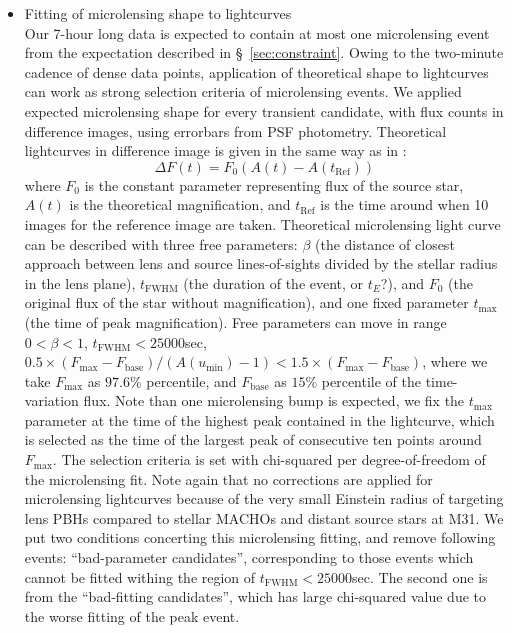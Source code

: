 \documentclass[iop, apj]{emulateapj}
\newcommand{\?}{\stackrel{?}{=}}
\begin{document}
%
\begin{itemize}
%
\item{Fitting of microlensing shape to lightcurves}\\
Our 7-hour long data is expected to contain at most 
one microlensing event from the expectation described in \S~\ref{sec:constraint}. 
Owing to the two-minute cadence of dense data points, 
application of theoretical shape to lightcurves can work as 
strong selection criteria of microlensing events. 
We applied expected microlensing shape for every transient candidate, 
with flux counts in difference images, using errorbars from PSF photometry. 
Theoretical lightcurves in difference image is given in the same way as in \citet{deJongetal:06}:
%
\begin{equation}
\Delta F (t)= F_0 (A(t) - A(t_\mathrm{Ref}))
\label{eq:chi2dof}
\end{equation}
%
where $F_0$ is the constant parameter representing flux of the source star, 
$A(t)$ is the theoretical magnification, and  
$t_\mathrm{Ref}$ is the time around when 10 images for the reference image are taken. 
Theoretical microlensing light curve can be described %
with three free parameters: $\beta$ (the distance of closest approach between lens and source lines-of-sights divided by the stellar radius in the lens plane), $t_\mathrm{FWHM}$ (the duration of the event, or $t_E$?), and $F_0$ (the original flux of the star without magnification),
and one fixed parameter $t_\mathrm{max}$ (the time of peak magnification). 
Free parameters can move in range $0<\beta<1$, $t_\mathrm{FWHM}<25000$sec, 
$0.5 \times (F_\mathrm{max}-F_\mathrm{base})/(A(u_\mathrm{min})-1)<1.5\times (F_\mathrm{max}-F_\mathrm{base})$, 
where we take $F_\mathrm{max}$ as $97.6\%$ percentile, and $F_\mathrm{base}$ as $15\%$ percentile of the time-variation flux. 
Note than one microlensing bump is expected, 
we fix the $t_\mathrm{max}$ parameter at the time of the highest peak contained in the lightcurve, 
which is selected as the time of the largest peak of consecutive ten points around $F_\mathrm{max}$.  
The selection criteria is set with chi-squared per degree-of-freedom of the microlensing fit. 
Note again that no corrections are applied for microlensing lightcurves 
because of the very small Einstein radius of targeting lens PBHs compared to stellar MACHOs 
and distant source stars at M31. 
We put two conditions concerting this microlensing fitting, and remove following events: 
``bad-parameter candidates'', corresponding to those events which cannot be fitted withing the 
region of $t_\mathrm{FWHM}<25000$sec. 
The second one is from the ``bad-fitting candidates'', which has large chi-squared value 
due to the worse fitting of the peak event. 

\end{itemize}
\end{document}
